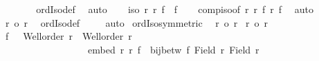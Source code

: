 \begin{isabellebody}
\ \ \isamarkupfalse%
\ {\isacharasterisk}{\kern0pt}\ {\isacharasterisk}{\kern0pt}{\isacharasterisk}{\kern0pt}\ \isamarkupfalse%
\ ordIso{\isacharunderscore}{\kern0pt}def\ \isamarkupfalse%
\ auto\isanewline
\ \ \isamarkupfalse%
\ {\isachardoublequoteopen}iso\ r\ r{\isacharprime}{\kern0pt}{\isacharprime}{\kern0pt}\ {\isacharparenleft}{\kern0pt}f{\isacharprime}{\kern0pt}\ {\isasymcirc}\ f{\isacharparenright}{\kern0pt}{\isachardoublequoteclose}\isanewline
\ \ \isamarkupfalse%
\ comp{\isacharunderscore}{\kern0pt}iso{\isacharbrackleft}{\kern0pt}of\ r\ r{\isacharprime}{\kern0pt}\ f\ r{\isacharprime}{\kern0pt}{\isacharprime}{\kern0pt}\ f{\isacharprime}{\kern0pt}{\isacharbrackright}{\kern0pt}\ \isamarkupfalse%
\ auto\isanewline
\ \ \isamarkupfalse%
\ {\isachardoublequoteopen}r\ {\isacharequal}{\kern0pt}o\ r{\isacharprime}{\kern0pt}{\isacharprime}{\kern0pt}{\isachardoublequoteclose}\ \isamarkupfalse%
\ ordIso{\isacharunderscore}{\kern0pt}def\ \isamarkupfalse%
\ {}\ \isamarkupfalse%
\ auto\isanewline
{}\isamarkupfalse%
%
\endisatagproof
{\isafoldproof}%
%
\isadelimproof
\isanewline
%
\endisadelimproof
\isanewline
{}\isamarkupfalse%
\ ordIso{\isacharunderscore}{\kern0pt}symmetric{\isacharcolon}{\kern0pt}\isanewline
{}\ {\isacharasterisk}{\kern0pt}{\isacharcolon}{\kern0pt}\ {\isachardoublequoteopen}r\ {\isacharequal}{\kern0pt}o\ r{\isacharprime}{\kern0pt}{\isachardoublequoteclose}\isanewline
{}\ {\isachardoublequoteopen}r{\isacharprime}{\kern0pt}\ {\isacharequal}{\kern0pt}o\ r{\isachardoublequoteclose}\isanewline
%
\isadelimproof
%
\endisadelimproof
%
\isatagproof
{}\isamarkupfalse%
{\isacharminus}{\kern0pt}\isanewline
\ \ \isamarkupfalse%
\ f\ \ {}{\isacharcolon}{\kern0pt}\ {\isachardoublequoteopen}Well{\isacharunderscore}{\kern0pt}order\ r\ {\isasymand}\ Well{\isacharunderscore}{\kern0pt}order\ r{\isacharprime}{\kern0pt}{\isachardoublequoteclose}\ \isanewline
\ \ \ \ \ \ \ \ \ \ \ \ \ \ \ \ \ {}{\isacharcolon}{\kern0pt}\ {\isachardoublequoteopen}embed\ r\ r{\isacharprime}{\kern0pt}\ f\ {\isasymand}\ bij{\isacharunderscore}{\kern0pt}betw\ f\ {\isacharparenleft}{\kern0pt}Field\ r{\isacharparenright}{\kern0pt}\ {\isacharparenleft}{\kern0pt}Field\ r{\isacharprime}{\kern0pt}{\isacharparenright}{\kern0pt}{\isachardoublequoteclose}\isanewline

\end{isabellebody}
